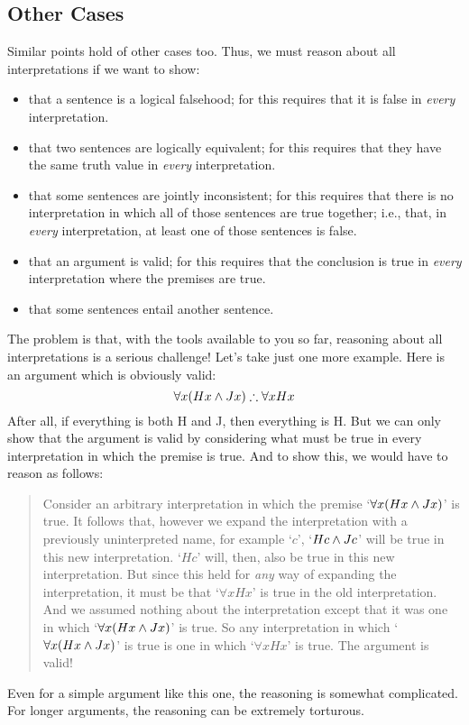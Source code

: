 \begin{earg}
\section{Other Cases}
Similar points hold of other cases too. Thus, we must reason about all interpretations if we want to show:
	\begin{itemize}
		\item that a sentence is a logical falsehood; for this requires that it is false in \emph{every} interpretation. 
		\item that two sentences are logically equivalent; for this requires that they have the same truth value in \emph{every} interpretation.
		\item that some sentences are jointly inconsistent; for this requires that there is no interpretation in which all of those sentences are true together; i.e., that, in \emph{every} interpretation, at  least one of those sentences is false.
		\item that an argument is valid; for this requires that the conclusion is true in \emph{every} interpretation where the premises are true. 
		\item that some sentences entail another sentence.
	\end{itemize}
The problem is that, with the tools available to you so far, reasoning about all interpretations is a serious challenge! Let's take just one more example. Here is an argument which is obviously valid:
	$$\forall x(Hx \wedge Jx) \mathrel{\therefore} \forall x Hx$$
After all, if everything is both H and J, then everything is H. But we can only show that the argument is valid by considering what must be true in every interpretation in which the premise is true. And to show this, we would have to reason as follows:
	\begin{quote}
		Consider an arbitrary interpretation in which the premise `$\forall x(Hx \wedge Jx)$' is true. It follows that, however we expand the interpretation with a previously uninterpreted name, for example `$c$', `$Hc \wedge Jc$' will be true in this new interpretation. `$Hc$' will, then, also be true in this new interpretation. But since this held for \emph{any} way of expanding the interpretation, it must be that `$\forall x Hx$' is true in the old interpretation. And we assumed nothing about the interpretation except that it was one in which `$\forall x(Hx \wedge Jx)$'  is true. So any interpretation in which `$\forall x(Hx \wedge Jx)$' is true is one in which `$\forall x Hx$' is true. The argument is valid!
\end{quote}
Even for a simple argument like this one, the reasoning is somewhat complicated. For longer arguments, the reasoning can be extremely torturous.


\end{earg}
